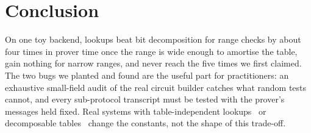 \section{Conclusion}\label{sec:conclusion}

On one toy backend, lookups beat bit decomposition for range checks by about four times in prover time once the
range is wide enough to amortise the table, gain nothing for narrow ranges, and never reach the five times we first
claimed. The two bugs we planted and found are the useful part for practitioners: an exhaustive small-field
audit of the real circuit builder catches what random tests cannot, and every sub-protocol transcript must be
tested with the prover's messages held fixed. Real systems with table-independent lookups~\cite{EFG22} or
decomposable tables~\cite{STW24} change the constants, not the shape of this trade-off.
